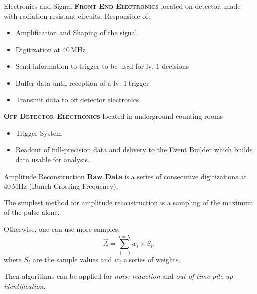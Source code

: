 \documentclass[10pt]{beamer}
\begin{document}
\begin{frame}{Electronics and Signal}
    \textsc{\textbf{Front End Electronics}} located on-detector, made with radiation resistant circuits. Responsible of:
    \begin{itemize}
        \item Amplification and Shaping of the signal
        \item Digitization at $40\,$MHz
        \item Send information to trigger to be used for lv. 1 decisions
        \item Buffer data until reception of a lv. 1 trigger
        \item Transmit data to off detector electronics
    \end{itemize}{}
    \textsc{\textbf{Off Detector Electronics}} located in underground counting rooms
    \begin{itemize}
        \item Trigger System
        \item Readout of full-precision data and delivery to the Event Builder which builds data usable for analysis.
    \end{itemize}
\end{frame}

\begin{frame}{Amplitude Reconstruction}
    \textbf{Raw Data} is a series of consecutive digitizations at $40\,$MHz (Bunch Crossing Frequency).
    
    The simplest method for amplitude reconstruction is a sampling of the maximum of the pulse alone.
    
    Otherwise, one can use more samples:
    \begin{equation}
        \hat{A} = \sum_{i=0}^{i=N} w_i \times S_i ,
    \end{equation}
    where $S_i$ are the sample values and $w_i$ a series of weights. 
    
    Then algorithms can be applied for \emph{noise reduction} and \emph{out-of-time pile-up identification}.
\end{frame}
\end{document}
